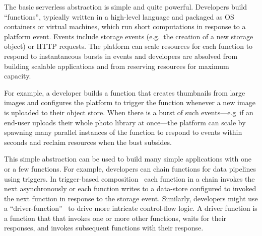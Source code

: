 
The basic serverless abstraction is simple and quite powerful. Developers build
``functions'', typically written in a high-level language and packaged as OS
containers or virtual machines, which run short computations in response to a
platform event. Events include storage events (e.g.\ the creation of a new
storage object) or HTTP requests. The platform can scale resources for each
function to respond to instantaneous bursts in events and developers are
absolved from building scalable applications and from reserving resources for
maximum capacity.

For example, a developer builds a function that creates thumbnails from large
images and configures the platform to trigger the function whenever a new image
is uploaded to their object store. When there is a burst of such events---e.g\
if an end-user uploads their whole photo library at once---the platform can
scale by spawning many parallel instances of the function to respond to events
within seconds and reclaim resources when the bust subsides.

This simple abstraction can be used to build many simple applications with one
or a few functions. For example, developers can chain functions for data
pipelines using triggers. In trigger-based composition~\cite{netherite} each
function in a chain invokes the next asynchronously or each function writes to a
data-store configured to invoked the next function in response to the storage
event. Similarly, developers might use a ``driver-function''~\cite{beldi} to
drive more intricate control-flow logic. A driver function is a function that
that invokes one or more other functions, waits for their responses, and invokes
subsequent functions with their response.

